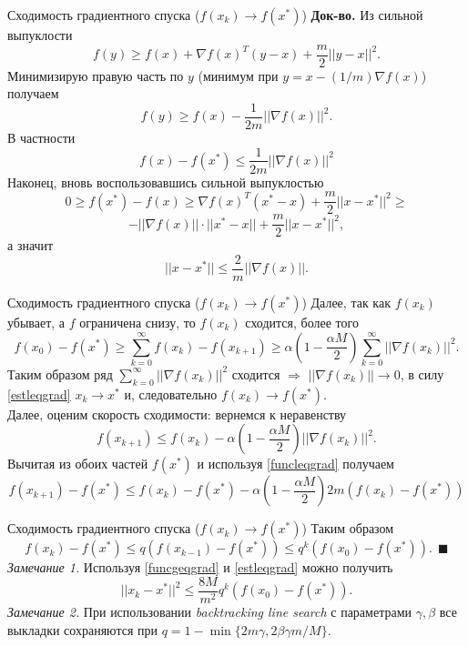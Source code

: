 \documentclass[10pt]{beamer}
\begin{document}
\begin{frame}{Сходимость градиентного спуска ($f(x_k)\rightarrow f(x^*)$)}
\textbf{Док-во.} Из сильной выпуклости
$$
f(y)\geq f(x)+\nabla f(x)^T(y-x)+\frac{m}{2}||y-x||^2.
$$
Минимизирую правую часть по $y$ (минимум при $y=x-(1/m)\nabla f(x)$) получаем
$$
f(y)\geq f(x)-\frac{1}{2m}||\nabla f(x)||^2.
$$
В частности
\begin{equation}\label{funcleqgrad}
f(x)-f(x^*)\leq \frac{1}{2m}||\nabla f(x)||^2
\end{equation}
\pause
Наконец, вновь воспользовавшись сильной выпуклостью
$$
0\geq f(x^*)- f(x)\geq\nabla f(x)^T(x^*-x)+\frac{m}{2}||x-x^*||^2\geq
$$
$$
-||\nabla f(x)||\cdot||x^*-x||+\frac{m}{2}||x-x^*||^2,
$$
а значит
\begin{equation}\label{estleqgrad}
||x-x^*||\leq \frac{2}{m}||\nabla f(x)||.
\end{equation}
\end{frame}

\begin{frame}{Сходимость градиентного спуска ($f(x_k)\rightarrow f(x^*)$)}
Далее, так как $f(x_k)$ убывает, а $f$ ограничена снизу, то $f(x_k)$ сходится, более того
$$
f(x_0)-f(x^*)\geq \sum_{k=0}^\infty f(x_k)-f(x_{k+1})\geq \alpha\left(1-\frac{\alpha M}{2}\right)\sum_{k=0}^\infty||\nabla f(x_k)||^2.
$$
\pause
Таким образом ряд $\sum_{k=0}^\infty||\nabla f(x_k)||^2$ сходится $\Rightarrow$ $||\nabla f(x_k)||\rightarrow 0$, в силу \eqref{estleqgrad} $x_k\rightarrow x^*$ и, следовательно $f(x_k)\rightarrow f(x^*)$. \\
\pause
\vspace{1em}
Далее, оценим скорость сходимости: вернемся к неравенству
$$
f(x_{k+1})\leq f(x_k)-\alpha\left(1-\frac{\alpha M}{2}\right)||\nabla f(x_k)||^2.
$$
Вычитая из обоих частей $f(x^*)$ и используя \eqref{funcleqgrad} получаем
$$
f(x_{k+1})-f(x^*)\leq f(x_k)-f(x^*)-\alpha\left(1-\frac{\alpha M}{2}\right)2m(f(x_k)-f(x^*))
$$
\end{frame}

\begin{frame}{Сходимость градиентного спуска ($f(x_k)\rightarrow f(x^*)$)}
Таким образом
$$
f(x_{k})-f(x^*)\leq q(f(x_{k-1})-f(x^*))\leq q^k(f(x_0)-f(x^*)).~~\blacksquare
$$
\pause
\textit{Замечание 1.} Используя \eqref{funcgeqgrad} и \eqref{estleqgrad} можно получить 
$$
||x_k-x^*||^2\leq \frac{8M}{m^2}q^k(f(x_0)-f(x^*)).
$$
\pause
\textit{Замечание 2.} При использовании \textit{backtracking line search} с параметрами $\gamma, \beta$ все выкладки
сохраняются при $q=1-\min\{2m\gamma, 2\beta\gamma m/M\}$. 
\end{frame}
\end{document}
